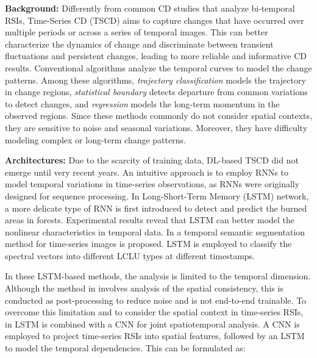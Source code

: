 \textbf{Background:} Differently from common CD studies that analyze bi-temporal RSIs, Time-Series CD (TSCD) aims to capture changes that have occurred over multiple periods or across a series of temporal images. This can better characterize the dynamics of change \cite{li2023sartscc} and discriminate between transient fluctuations and persistent changes, leading to more reliable and informative CD results. Conventional algorithms analyze the temporal curves to model the change patterns. Among these algorithms, \textit{trajectory classification} models the trajectory in change regions, \textit{statistical boundary} detects departure from common variations to detect changes, and \textit{regression} models the long-term momentum in the observed regions\cite{stahl2023automated}. Since these methods commonly do not consider spatial contexts, they are sensitive to noise and seasonal variations. Moreover, they have difficulty modeling complex or long-term change patterns. 

\textbf{Architectures:} Due to the scarcity of training data, DL-based TSCD did not emerge until very recent years. An intuitive approach is to employ RNNs to model temporal variations in time-series observations, as RNNs were originally designed for sequence processing. In \cite{yuan2020using} Long-Short-Term Memory (LSTM) network, a more delicate type of RNN is first introduced to detect and predict the burned areas in forests. Experimental results reveal that LSTM can better model the nonlinear characteristics in temporal data. In \cite{he2024timeseries} a temporal semantic segmentation method for time-series images is proposed. LSTM is employed to classify the spectral vectors into different LCLU types at different timestamps.

In these LSTM-based methods, the analysis is limited to the temporal dimension. Although the method in \cite{he2024timeseries} involves analysis of the spatial consistency, this is conducted as post-processing to reduce noise and is not end-to-end trainable. To overcome this limitation and to consider the spatial context in time-series RSIs, in \cite{sefrin2020deep} LSTM is combined with a CNN for joint spatiotemporal analysis. A CNN is employed to project time-series RSIs into spatial features, followed by an LSTM to model the temporal dependencies. This can be formulated as:

